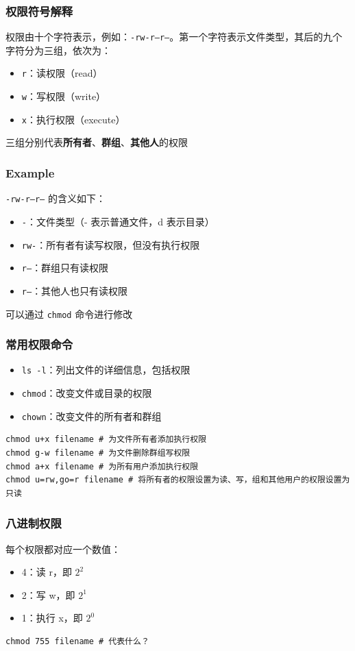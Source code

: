 \documentclass[UTF8, 16pt]{beamer}
\begin{document}
\begin{frame}
    \frametitle{权限符号解释}
    
    权限由十个字符表示，例如：\texttt{-rw-r--r--}。第一个字符表示文件类型，其后的九个字符分为三组，依次为：
    \begin{itemize}
        \item \texttt{r}：读权限（read）
        \item \texttt{w}：写权限（write）
        \item \texttt{x}：执行权限（execute）
    \end{itemize}
    三组分别代表\textbf{所有者}、\textbf{群组}、\textbf{其他人}的权限
\end{frame}

\begin{frame}
    \frametitle{Example}
    \textcolor{sufered}{\texttt{-rw-r--r--} 的含义如下：}
    
    \begin{itemize}
        \item \texttt{-}：文件类型（- 表示普通文件，d 表示目录）
        \item \texttt{rw-}：所有者有读写权限，但没有执行权限
        \item \texttt{r--}：群组只有读权限
        \item \texttt{r--}：其他人也只有读权限
    \end{itemize}
    可以通过 \texttt{chmod} 命令进行修改
\end{frame}

\begin{frame}[fragile]
    \frametitle{常用权限命令}
    
    \begin{itemize}
        \item \texttt{ls -l}：列出文件的详细信息，包括权限
        \item \texttt{chmod}：改变文件或目录的权限
        \item \texttt{chown}：改变文件的所有者和群组
    \end{itemize}
    \begin{lstlisting}
chmod u+x filename # 为文件所有者添加执行权限
chmod g-w filename # 为文件删除群组写权限
chmod a+x filename # 为所有用户添加执行权限
chmod u=rw,go=r filename # 将所有者的权限设置为读、写，组和其他用户的权限设置为只读\end{lstlisting}
\end{frame}

\begin{frame}[fragile]
    \frametitle{八进制权限}
    \textcolor{sufered}{每个权限都对应一个数值：}
    
    \begin{itemize}
        \item 4：读 r，即 $2^2$
        \item 2：写 w，即 $2^1$
        \item 1：执行 x，即 $2^0$
    \end{itemize}
    \begin{lstlisting}[numbers=none]
chmod 755 filename # 代表什么？\end{lstlisting}
\end{frame}
\end{document}
